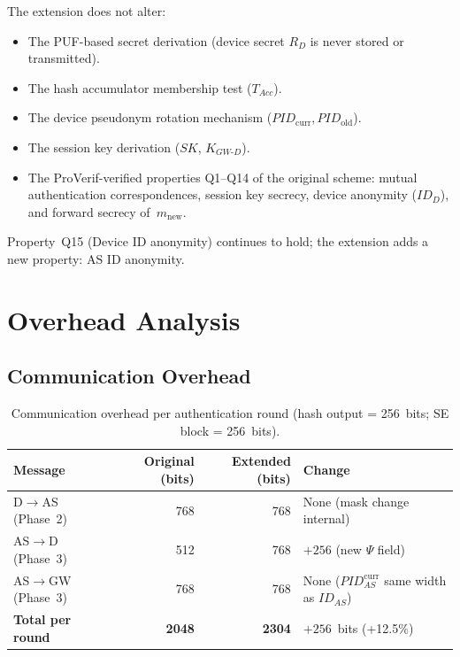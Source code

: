 \documentclass[12pt,a4paper]{article}
\newcommand{\IDd}{\mathit{ID}_D}
\newcommand{\IDas}{\mathit{ID}_{AS}}
\newcommand{\PIDcurr}{\mathit{PID}_{\mathrm{curr}}}
\newcommand{\PIDown}{\mathit{PID}_{\mathrm{old}}}
\newcommand{\PIDascurr}{\mathit{PID}_{AS}^{\mathrm{curr}}}
\newcommand{\KGWd}{K_{GW\text{-}D}}
\newcommand{\SK}{\mathit{SK}}
\newcommand{\Rd}{R_D}
\newcommand{\TAcc}{T_{\mathit{Acc}}}
\begin{document}
The extension does not alter:
\begin{itemize}
  \item The PUF-based secret derivation (device secret $\Rd$ is never
        stored or transmitted).
  \item The hash accumulator membership test ($\TAcc$).
  \item The device pseudonym rotation mechanism ($\PIDcurr, \PIDown$).
  \item The session key derivation ($\SK$, $\KGWd$).
  \item The ProVerif-verified properties Q1--Q14 of the original scheme:
        mutual authentication correspondences, session key secrecy,
        device anonymity ($\IDd$), and forward secrecy of~$m_{\mathrm{new}}$.
\end{itemize}
Property~Q15 (Device ID anonymity) continues to hold; the extension
adds a new property: AS ID anonymity.

\section{Overhead Analysis}

\subsection{Communication Overhead}

\begin{table}[H]
\caption{Communication overhead per authentication round
         (hash output = 256~bits; SE block = 256~bits).}
\label{tab:comm-overhead}
\centering
\renewcommand{\arraystretch}{1.3}
\begin{tabularx}{\textwidth}{@{}lrrX@{}}
\toprule
\textbf{Message} & \textbf{Original (bits)} & \textbf{Extended (bits)} & \textbf{Change} \\
\midrule
D$\to$AS (Phase~2)    & 768   & 768   & None (mask change internal) \\
AS$\to$D (Phase~3)    & 512   & 768   & $+256$ (new $\Psi$ field) \\
AS$\to$GW (Phase~3)   & 768   & 768   & None ($\PIDascurr$ same width as $\IDas$) \\
\midrule
\textbf{Total per round} & \textbf{2048} & \textbf{2304} & $+256$~bits (+12.5\%) \\
\bottomrule
\end{tabularx}
\end{table}
\end{document}
